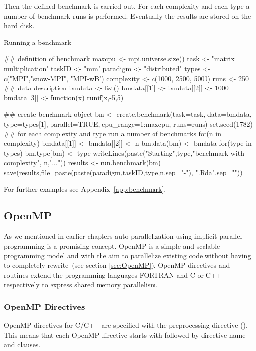 Then the defined benchmark is carried out. For each complexity and
each type a number of benchmark runs is performed. Eventually the
results are stored on the hard disk.

\begin{Example} Running a benchmark
\label{ex:benchmarkruns}
\begin{Scode}

## definition of benchmark
maxcpu <- mpi.universe.size()
task <- "matrix multiplication"
taskID <- "mm"
paradigm <- "distributed"
types <- c("MPI","snow-MPI", "MPI-wB")
complexity <- c(1000, 2500, 5000)
runs <- 250
## data description
bmdata <- list()
bmdata[[1]] <- bmdata[[2]] <- 1000
bmdata[[3]] <- function(x){
  runif(x,-5,5)
}

## create benchmark object
bm <- create.benchmark(task=task, data=bmdata,
                       type=types[1], parallel=TRUE,
                       cpu_range=1:maxcpu, runs=runs)
set.seed(1782)
## for each complexity and type run a number of benchmarks
for(n in complexity){
  bmdata[[1]] <- bmdata[[2]] <- n
  bm.data(bm) <- bmdata
  for(type in types){
    bm.type(bm) <- type
    writeLines(paste("Starting",type,"benchmark with complexity",
               n,"..."))
    results <- run.benchmark(bm)
    save(results,file=paste(paste(paradigm,taskID,type,n,sep="-"),
         ".Rda",sep=""))
  }
}

\end{Scode}
\end{Example}

For further examples see Appendix~\ref{app:benchmark}.

\subsection{OpenMP}

As we mentioned in earlier chapters auto-parallelization using
implicit parallel programming is a promising concept. OpenMP is a simple and
scalable programming model and with the aim to parallelize existing code
without having to completely rewrite~(see section
\ref{sec:OpenMP}). OpenMP directives and routines extend the
programming languages FORTRAN and C or C++ respectively to express
shared memory parallelism.

\subsubsection{OpenMP Directives}

OpenMP directives for C/C++ are specified with the \textbf{}
preprocessing directive (\cite{openMP05}). This means that each
OpenMP directive starts with \textbf{} followed by
directive name and clauses. 
 

